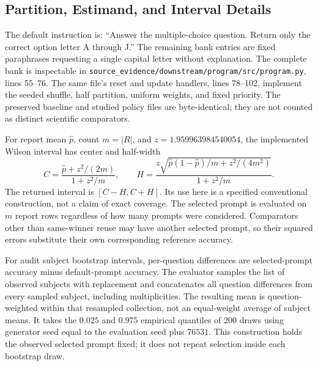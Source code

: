 \documentclass{article}
\begin{document}
\subsection{Partition, Estimand, and Interval Details}
The default instruction is: ``Answer the multiple-choice question. Return only the correct option letter A through J.'' The remaining bank entries are fixed paraphrases requesting a single capital letter without explanation. The complete bank is inspectable in \texttt{source\_evidence/downstream/}\texttt{program/src/program.py}, lines 55--76. The same file's reset and update handlers, lines 78--102, implement the seeded shuffle, half partition, uniform weights, and fixed priority. The preserved baseline and studied policy files are byte-identical; they are not counted as distinct scientific comparators.

For report mean $\widehat p$, count $m=|R|$, and $z=1.959963984540054$, the implemented Wilson interval has center and half-width
\begin{equation}
 C=\frac{\widehat p+z^2/(2m)}{1+z^2/m},\qquad
 H=\frac{z\sqrt{\widehat p(1-\widehat p)/m+z^2/(4m^2)}}{1+z^2/m}.
\end{equation}
The returned interval is $[C-H,C+H]$. Its use here is a specified conventional construction, not a claim of exact coverage. The selected prompt is evaluated on $m$ report rows regardless of how many prompts were considered. Comparators other than same-winner reuse may have another selected prompt, so their squared errors substitute their own corresponding reference accuracy.

For audit subject bootstrap intervals, per-question differences are selected-prompt accuracy minus default-prompt accuracy. The evaluator samples the list of observed subjects with replacement and concatenates all question differences from every sampled subject, including multiplicities. The resulting mean is question-weighted within that resampled collection, not an equal-weight average of subject means. It takes the $0.025$ and $0.975$ empirical quantiles of $200$ draws using generator seed equal to the evaluation seed plus $76531$. This construction holds the observed selected prompt fixed; it does not repeat selection inside each bootstrap draw.
\end{document}
